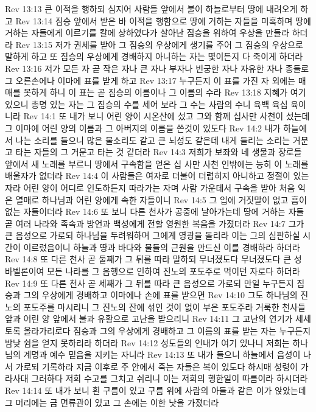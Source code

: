 Rev 13:13  큰 이적을 행하되 심지어 사람들 앞에서 불이 하늘로부터 땅에 내려오게 하고
Rev 13:14  짐승 앞에서 받은 바 이적을 행함으로 땅에 거하는 자들을 미혹하며 땅에 거하는 자들에게 이르기를 칼에 상하였다가 살아난 짐승을 위하여 우상을 만들라 하더라
Rev 13:15  저가 권세를 받아 그 짐승의 우상에게 생기를 주어 그 짐승의 우상으로 말하게 하고 또 짐승의 우상에게 경배하지 아니하는 자는 몇이든지 다 죽이게 하더라
Rev 13:16  저가 모든 자 곧 작은 자나 큰 자나 부자나 빈궁한 자나 자유한 자나 종들로 그 오른손에나 이마에 표를 받게 하고
Rev 13:17  누구든지 이 표를 가진 자 외에는 매매를 못하게 하니 이 표는 곧 짐승의 이름이나 그 이름의 수라
Rev 13:18  지혜가 여기 있으니 총명 있는 자는 그 짐승의 수를 세어 보라 그 수는 사람의 수니 육백 육십 육이니라
Rev 14:1  또 내가 보니 어린 양이 시온산에 섰고 그와 함께 십사만 사천이 섰는데 그 이마에 어린 양의 이름과 그 아버지의 이름을 쓴것이 있도다
Rev 14:2  내가 하늘에서 나는 소리를 들으니 많은 물소리도 같고 큰 뇌성도 같은데 내게 들리는 소리는 거문고 타는 자들의 그 거문고 타는 것 같더라
Rev 14:3  저희가 보좌와 네 생물과 장로들 앞에서 새 노래를 부르니 땅에서 구속함을 얻은 십 사만 사천 인밖에는 능히 이 노래를 배울자가 없더라
Rev 14:4  이 사람들은 여자로 더불어 더럽히지 아니하고 정절이 있는 자라 어린 양이 어디로 인도하든지 따라가는 자며 사람 가운데서 구속을 받아 처음 익은 열매로 하나님과 어린 양에게 속한 자들이니
Rev 14:5  그 입에 거짓말이 없고 흠이 없는 자들이더라
Rev 14:6  또 보니 다른 천사가 공중에 날아가는데 땅에 거하는 자들 곧 여러 나라와 족속과 방언과 백성에게 전할 영원한 복음을 가졌더라
Rev 14:7  그가 큰 음성으로 가로되 하나님을 두려워하며 그에게 영광을 돌리라 이는 그의 심판하실 시간이 이르렀음이니 하늘과 땅과 바다와 물들의 근원을 만드신 이를 경배하라 하더라
Rev 14:8  또 다른 천사 곧 둘째가 그 뒤를 따라 말하되 무너졌도다 무너졌도다 큰 성 바벨론이여 모든 나라를 그 음행으로 인하여 진노의 포도주로 먹이던 자로다 하더라
Rev 14:9  또 다른 천사 곧 세째가 그 뒤를 따라 큰 음성으로 가로되 만일 누구든지 짐승과 그의 우상에게 경배하고 이마에나 손에 표를 받으면
Rev 14:10  그도 하나님의 진노의 포도주를 마시리니 그 진노의 잔에 섞인 것이 없이 부은 포도주라 거룩한 천사들 앞과 어린 양 앞에서 불과 유황으로 고난을 받으리니
Rev 14:11  그 고난의 연기가 세세토록 올라가리로다 짐승과 그의 우상에게 경배하고 그 이름의 표를 받는 자는 누구든지 밤낮 쉼을 얻지 못하리라 하더라
Rev 14:12  성도들의 인내가 여기 있나니 저희는 하나님의 계명과 예수 믿음을 지키는 자니라
Rev 14:13  또 내가 들으니 하늘에서 음성이 나서 가로되 기록하라 지금 이후로 주 안에서 죽는 자들은 복이 있도다 하시매 성령이 가라사대 그러하다 저희 수고를 그치고 쉬리니 이는 저희의 행한일이 따름이라 하시더라
Rev 14:14  또 내가 보니 흰 구름이 있고 구름 위에 사람의 아들과 같은 이가 앉았는데 그 머리에는 금 면류관이 있고 그 손에는 이한 낫을 가졌더라
